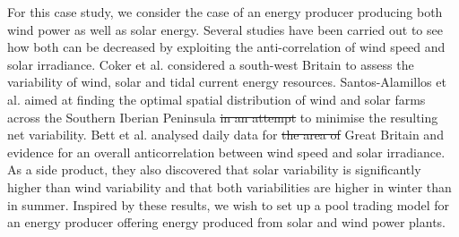 For this case study, we consider the case of an energy producer producing both wind power as well as solar energy. Several studies have been carried out to see how both   can be decreased by exploiting the anti-correlation of wind speed and solar irradiance. Coker et al. considered a south-west Britain to assess the variability of wind, solar and tidal current energy resources. Santos-Alamillos et al. aimed at finding the optimal spatial distribution of wind and solar farms across the Southern Iberian Peninsula \sout{in an attempt} to minimise the resulting net variability. Bett et al. analysed daily data for \sout{the area of} Great Britain and   evidence for an overall anticorrelation between wind speed and solar irradiance. As a side product, they also discovered that solar variability is significantly higher than wind variability and that both variabilities are higher in winter than in summer. Inspired by these results, we wish to set up a pool trading model for an energy producer offering energy produced from solar and wind power plants.  

